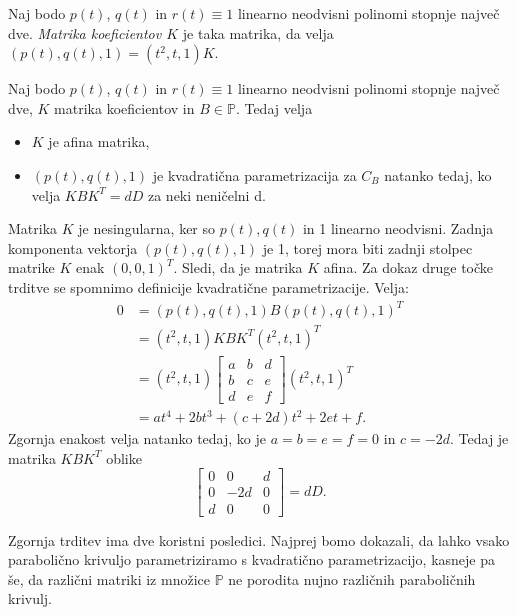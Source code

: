 \documentclass[mat1]{fmfdelo}
\newcommand{\PP}{\mathbb P}
\begin{document}
\begin{definicija}\label{defmatrikakoef}
Naj bodo $p(t)$, $q(t)$ in $r(t) \equiv 1$ linearno neodvisni polinomi stopnje največ dve. \emph{Matrika koeficientov $K$} je taka matrika, da velja $ (p(t), q(t), 1) = (t^2,t,1) K$.
\end{definicija} 

\begin{trditev}
Naj bodo $p(t)$, $q(t)$ in $r(t) \equiv 1$ linearno neodvisni polinomi stopnje največ dve, $K$ matrika koeficientov in $B \in \PP$. Tedaj velja
\begin{itemize}
\item $K$ je afina matrika,
\item  $ ( p(t), q(t), 1)$ je kvadratična parametrizacija za $C_B$ natanko tedaj, ko velja $K B K^T = d D$ za neki neničelni d.
\end{itemize}
\end{trditev}

\begin{dokaz}
Matrika $K$ je nesingularna, ker so $p(t), q(t)$ in 1 linearno neodvisni. Zadnja komponenta vektorja $(p(t), q(t), 1)$ je 1, torej mora biti zadnji stolpec matrike $K$ enak $(0,0,1)^T$. Sledi, da je matrika $K$ afina. Za dokaz druge točke trditve se spomnimo definicije kvadratične parametrizacije.
Velja:
\begin{align*}
0 &= (p(t), q(t), 1) B (p(t), q(t), 1)^T \\
   &= (t^2, t, 1) K B K^T (t^2, t, 1)^T \\
   &= (t^2, t, 1) 
\begin{bmatrix}
a & b & d \\
b & c & e \\
d & e & f
\end{bmatrix}
(t^2, t, 1)^T \\
   &= a t^4 + 2 b t^3 + (c+2d)t^2 + 2et + f
.\end{align*}
Zgornja enakost velja natanko tedaj, ko je $a=b=e=f=0$ in $c=-2d$. Tedaj je matrika $KBK^T$ oblike
$$
\begin{bmatrix}
0 & 0 & d \\
0 & -2d & 0 \\
d & 0 & 0
\end{bmatrix}
=
dD.
$$
\end{dokaz}

Zgornja trditev ima dve koristni posledici. Najprej bomo dokazali, da lahko vsako parabolično krivuljo parametriziramo s kvadratično parametrizacijo, kasneje pa še, da različni matriki iz množice $\PP$ ne porodita nujno različnih paraboličnih krivulj.
\end{document}
